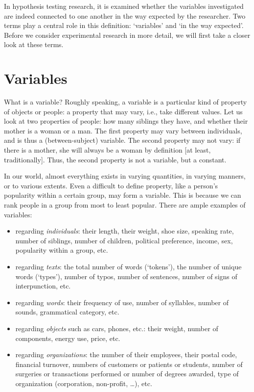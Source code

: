 \documentclass[
]{book}
\begin{document}
In hypothesis testing research, it is examined whether the variables investigated are indeed connected to one another in the way expected by the researcher. Two terms play a central role in this definition: `variables' and `in the way expected'. Before we consider experimental research in more detail, we will first take a closer look at these terms.

\hypertarget{sec:variables}{%
\section{Variables}\label{sec:variables}}

What is a variable? Roughly speaking, a variable is a particular kind of property of objects or people: a property that may vary, i.e., take different values. Let us look at two properties of people: how many siblings they have, and whether their mother is a woman or a man. The first property may vary between individuals, and is thus a (between-subject) variable. The second property may not vary: if there is a mother, she will always be a woman by definition {[}at least, traditionally{]}. Thus, the second property is not a variable, but a constant.

In our world, almost everything exists in varying quantities, in varying manners, or to various extents. Even a difficult to define property, like a person's popularity within a certain group, may form a variable. This is because we can rank people in a group from most to least popular. There are ample examples of variables:

\begin{itemize}
\item
  regarding \emph{individuals}: their length, their weight, shoe size, speaking rate, number of siblings, number of children, political preference, income, sex, popularity within a group, etc.
\item
  regarding \emph{texts}: the total number of words (`tokens'), the number of unique words (`types'), number of typos, number of sentences, number of signs of interpunction, etc.
\item
  regarding \emph{words}: their frequency of use, number of syllables, number of sounds, grammatical category, etc.
\item
  regarding \emph{objects} such as cars, phones, etc.: their weight, number of components, energy use, price, etc.
\item
  regarding \emph{organizations}: the number of their employees, their postal code, financial turnover, numbers of customers or patients or students, number of surgeries or transactions performed or number of degrees awarded, type of organization (corporation, non-profit, \ldots), etc.
\end{itemize}
\end{document}
